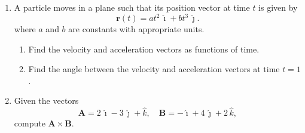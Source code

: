 \documentclass[12pt]{article}
\begin{document}
\begin{enumerate}
\[
\mathbf{F} = 200\,\hat{\imath} + 300\,\hat{\jmath} + 400\,\hat{k} 
\quad \left[\frac{\mathrm{L}}{\mathrm{m}^2 \cdot \mathrm{s}}\right]
\]

\begin{enumerate}
    \item Compute the area vector $\mathbf{A}$ of the surface (the vector normal to the surface with magnitude equal to the area of the surface).
    \item Compute the volume of water per unit time (in liters per second) passing through the surface using:
    \[
    Q = \mathbf{F} \cdot \mathbf{A}.
    \]
    \item Discuss how the orientation of the surface affects the water flow through it.
\end{enumerate}

    \item A particle moves in a plane such that its position vector at time \(t\) is given by
          \[
            \mathbf{r}(t) = at^2\,\hat{\imath} + bt^3\,\hat{\jmath}.
          \]
          where $a$ and $b$ are constants with appropriate units.
          \begin{enumerate}
            \item Find the velocity and acceleration vectors as functions of time.
            \item Find the angle between the velocity and acceleration vectors at time \(t = 1\).
          \end{enumerate}

    \item Given the vectors
\[
\mathbf{A} = 2\,\hat{\imath} - 3\,\hat{\jmath} + \hat{k}, \quad 
\mathbf{B} = -\hat{\imath} + 4\,\hat{\jmath} + 2\,\hat{k},
\]
compute $\mathbf{A} \times \mathbf{B}$.
    
          
\end{enumerate}
\end{document}
